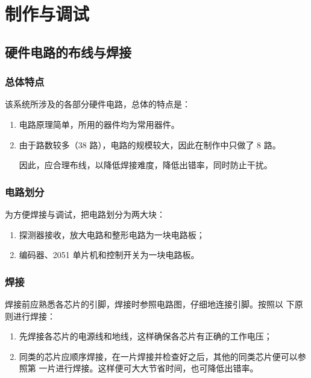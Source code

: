 \chapter{制作与调试}

\section{硬件电路的布线与焊接}

\subsection{总体特点}

该系统所涉及的各部分硬件电路，总体的特点是：

\begin{enumerate}
  \item 电路原理简单，所用的器件均为常用器件。
  \item 由于路数较多（38 路），电路的规模较大，因此在制作中只做了 8 路。
  
  因此，应合理布线，以降低焊接难度，降低出错率，同时防止干扰。
\end{enumerate}

\subsection{电路划分}

为方便焊接与调试，把电路划分为两大块：

\begin{enumerate}
  \item 探测器接收，放大电路和整形电路为一块电路板；
  \item 编码器、2051 单片机和控制开关为一块电路板。
\end{enumerate}

\subsection{焊接}

焊接前应熟悉各芯片的引脚，焊接时参照电路图，仔细地连接引脚。按照以
下原则进行焊接：

\begin{enumerate}
  \item 先焊接各芯片的电源线和地线，这样确保各芯片有正确的工作电压；
  \item 同类的芯片应顺序焊接，在一片焊接并检查好之后，其他的同类芯片便可以参照第
  一片进行焊接。这样便可大大节省时间，也可降低出错率。
\end{enumerate}


